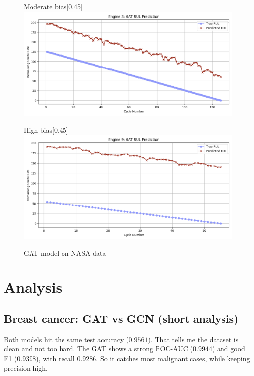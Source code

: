\documentclass[12pt]{article}
\begin{document}
\begin{figure}[H]
    \begin{subcaptionbox}{Moderate bias\label{fig_NASA_GAT_eng2}}[0.45\textwidth]
        {\includegraphics[width=\linewidth]{figures/NASA/NASA_GAT_eng1.png}}
    \end{subcaptionbox}
    \hfill
    \begin{subcaptionbox}{High bias\label{fig_NASA_GAT_eng3}}[0.45\textwidth]
        {\includegraphics[width=\linewidth]{figures/NASA/NASA_GAT_eng3.png}}
    \end{subcaptionbox}

    \caption{GAT model on NASA data}
    \label{GAT_NASA_all}
\end{figure}


\pagebreak
\section{Analysis} \label{sec_analysis}
\subsection*{Breast cancer: GAT vs GCN (short analysis)}

Both models hit the same test accuracy ($0.9561$). That tells me the dataset is clean and not too hard. The GAT shows a strong ROC-AUC ($0.9944$) and good F1 ($0.9398$), with recall $0.9286$. So it catches most malignant cases, while keeping precision high.
\end{document}
